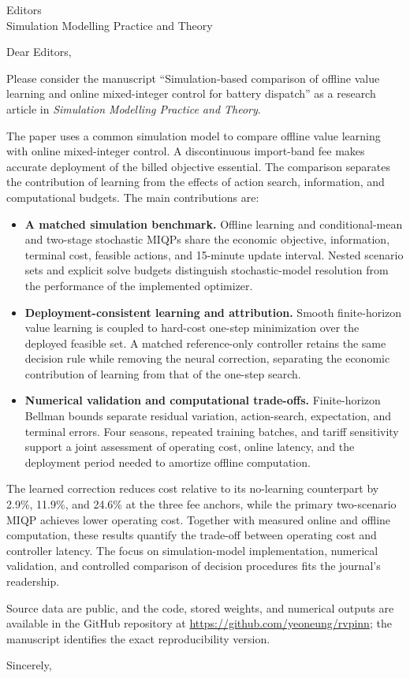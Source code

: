\documentclass[11pt,a4paper]{letter}
\date{13 September 2026}
\begin{document}
\begin{letter}{Editors\\Simulation Modelling Practice and Theory}
\opening{Dear Editors,}

Please consider the manuscript ``Simulation-based comparison of offline value
learning and online mixed-integer control for battery dispatch'' as a research
article in \emph{Simulation Modelling Practice and Theory}.

The paper uses a common simulation model to compare offline value learning
with online mixed-integer control. A discontinuous import-band fee makes
accurate deployment of the billed objective essential. The comparison
separates the contribution of learning from the effects of action search,
information, and computational budgets. The main contributions are:

\begin{itemize}[leftmargin=1.5em,itemsep=5pt,topsep=4pt,parsep=0pt]
\item \textbf{A matched simulation benchmark.} Offline learning and
conditional-mean and two-stage stochastic MIQPs share the economic objective,
information, terminal cost, feasible actions, and 15-minute update interval.
Nested scenario sets and explicit solve budgets distinguish stochastic-model
resolution from the performance of the implemented optimizer.

\item \textbf{Deployment-consistent learning and attribution.} Smooth
finite-horizon value learning is coupled to hard-cost one-step minimization
over the deployed feasible set. A matched reference-only controller retains
the same decision rule while removing the neural correction, separating the
economic contribution of learning from that of the one-step search.

\item \textbf{Numerical validation and computational trade-offs.} Finite-horizon
Bellman bounds separate residual variation, action-search, expectation, and
terminal errors. Four seasons, repeated training batches, and tariff
sensitivity support a joint assessment of operating cost, online latency,
and the deployment period needed to amortize offline computation.
\end{itemize}

The learned correction reduces cost relative to its no-learning counterpart
by 2.9\%, 11.9\%, and 24.6\% at the three fee anchors, while the primary
two-scenario MIQP achieves lower operating cost. Together with measured
online and offline computation, these results quantify the trade-off between
operating cost and controller latency. The focus on simulation-model
implementation, numerical validation, and controlled comparison of decision
procedures fits the journal's readership.

Source data are public, and the code, stored weights, and numerical
outputs are available in the GitHub repository at
\url{https://github.com/yeoneung/rvpinn}; the manuscript identifies the exact
reproducibility version.

\closing{Sincerely,}
\end{letter}
\end{document}

